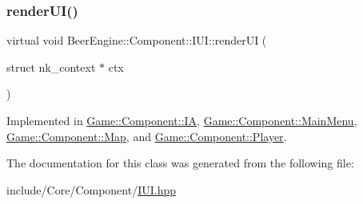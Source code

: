 \subsubsection{\texorpdfstring{render\+U\+I()}{renderUI()}}
{\footnotesize\ttfamily virtual void Beer\+Engine\+::\+Component\+::\+I\+U\+I\+::render\+UI (\begin{DoxyParamCaption}\item[{struct nk\+\_\+context $\ast$}]{ctx }\end{DoxyParamCaption})\hspace{0.3cm}{\ttfamily [pure virtual]}}



Implemented in \mbox{\hyperlink{class_game_1_1_component_1_1_i_a_a50991daa660054341c1f339611226c02}{Game\+::\+Component\+::\+IA}}, \mbox{\hyperlink{class_game_1_1_component_1_1_main_menu_a36f876bbeca9056e17c6d13b82fc3364}{Game\+::\+Component\+::\+Main\+Menu}}, \mbox{\hyperlink{class_game_1_1_component_1_1_map_af062dd2c3e677c1d3d9204cac8508dde}{Game\+::\+Component\+::\+Map}}, and \mbox{\hyperlink{class_game_1_1_component_1_1_player_a5d5f837406a8e9f62dbe2c83ab3751b6}{Game\+::\+Component\+::\+Player}}.



The documentation for this class was generated from the following file\+:\begin{DoxyCompactItemize}
\item 
include/\+Core/\+Component/\mbox{\hyperlink{_i_u_i_8hpp}{I\+U\+I.\+hpp}}\end{DoxyCompactItemize}
